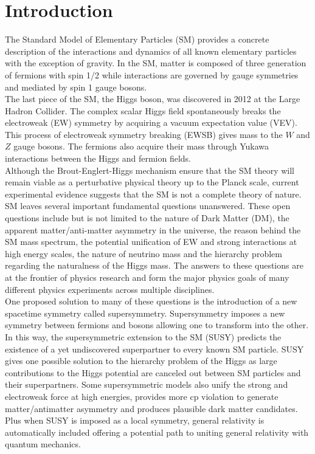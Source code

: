 \chapter{Introduction}
\label{introduction}

\indent The Standard Model of Elementary Particles (SM) provides a concrete description of the interactions and dynamics of all known elementary particles with the exception of gravity.  In the SM, matter is composed of three generation of fermions with spin 1/2 while interactions are governed by gauge symmetries and mediated by spin 1 gauge bosons.  \\

\indent The last piece of the SM, the Higgs boson, was discovered in 2012 at the Large Hadron Collider.  The complex scalar Higgs field spontaneously breaks the electroweak (EW) symmetry by acquiring a vacuum expectation value (VEV). This process of electroweak symmetry breaking (EWSB) gives mass to the $W$ and $Z$ gauge bosons. The fermions also acquire their mass through Yukawa interactions between the Higgs and fermion fields. \\

\indent Although the Brout-Englert-Higgs mechanism ensure that the SM theory will remain viable as a perturbative physical theory up to the Planck scale, current experimental evidence suggests that the SM is not a complete theory of nature.  SM leaves several important fundamental questions unanswered.  These open questions include but is not limited to the nature of Dark Matter (DM), the apparent matter/anti-matter asymmetry in the universe,  the reason behind the SM mass spectrum, the potential unification of EW and strong interactions at high energy scales, the nature of neutrino mass and the hierarchy problem regarding the naturalness of the Higgs mass.  The answers to these questions are at the frontier of physics research and form the major physics goals of many different physics experiments across multiple disciplines. \\

\indent One proposed solution to many of these questions is the introduction of a new spacetime symmetry called supersymmetry.  Supersymmetry imposes a new symmetry between fermions and bosons allowing one to transform into the other.  In this way, the supersymmetric extension to the SM (SUSY) predicts the existence of a yet undiscovered superpartner to every known SM particle.  SUSY gives one possible solution to the hierarchy problem of the Higgs as large contributions to the Higgs potential are canceled out between SM particles and their superpartners.  Some supersymmetric models also unify the strong and electroweak force at high energies, provides more cp violation to generate matter/antimatter asymmetry and produces plausible dark matter candidates.  Plus when SUSY is imposed as a local symmetry, general relativity is automatically included offering a potential path to uniting general relativity with quantum mechanics.  \\

